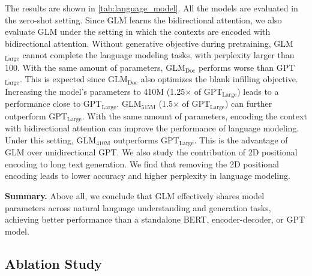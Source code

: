 The results are shown in \ref{tab:language_model}. All the models are evaluated in the zero-shot setting. Since GLM learns the bidirectional attention, we also evaluate GLM under the setting in which the contexts are encoded with bidirectional attention. Without generative objective during pretraining, GLM$_\text{Large}$ cannot complete the language modeling tasks, with perplexity larger than 100. With the same amount of parameters, GLM$_\text{Doc}$ performs worse than GPT$_\text{Large}$. This is expected since GLM$_\text{Doc}$ also optimizes the blank infilling objective. Increasing the model's parameters to 410M (1.25$\times$ of GPT$_\text{Large}$) leads to a performance close to GPT$_\text{Large}$. GLM$_\text{515M}$ (1.5$\times$ of GPT$_\text{Large}$) can further outperform GPT$_\text{Large}$. With the same amount of parameters, encoding the context with bidirectional attention can improve the performance of language modeling. Under this setting, GLM$_\text{410M}$ outperforms GPT$_\text{Large}$. This is the advantage of GLM over unidirectional GPT. We also study the contribution of 2D positional encoding to long text generation. We find that removing the 2D positional encoding leads to lower accuracy and higher perplexity in language modeling.

\textbf{Summary.} 
Above all, we conclude that GLM effectively shares model parameters across natural language understanding and generation tasks, achieving better performance than a standalone BERT, encoder-decoder, or GPT model. 

\subsection{Ablation Study}
\label{subsec:ablation}

